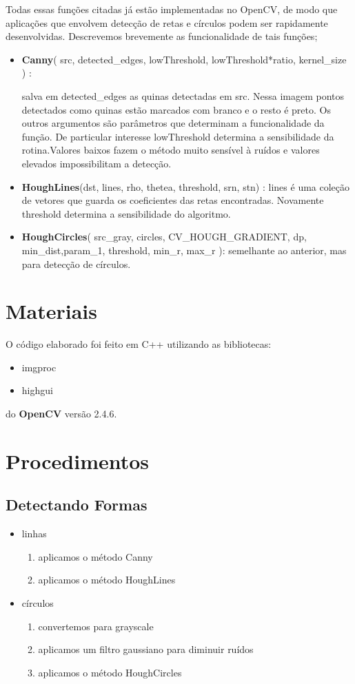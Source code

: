 \documentclass[journal]{IEEEtran}
\begin{document}
Todas essas funções citadas já estão
implementadas no OpenCV, de modo que aplicações que envolvem detecção
de retas e círculos podem ser rapidamente desenvolvidas. Descrevemos brevemente
as funcionalidade de tais funções;
\begin{itemize}
	\item 
	\textbf{Canny}( src, detected\_edges, lowThreshold, lowThreshold*ratio, kernel\_size ) :

	salva em detected\_edges as quinas detectadas em src. Nessa imagem pontos detectados como quinas estão marcados com branco e o resto é preto. Os outros
	argumentos são parâmetros que determinam a funcionalidade da função. De particular interesse lowThreshold determina a sensibilidade da rotina.Valores baixos
	fazem o método muito sensível à ruídos e valores elevados impossibilitam a detecção. 
	
	\item \textbf{HoughLines}(dst, lines, rho, thetea, threshold, srn, stn) :
	lines é uma coleção de vetores que guarda os coeficientes das retas
	encontradas. Novamente threshold determina a sensibilidade do algoritmo.
	
	\item \textbf{HoughCircles}( src\_gray, circles, CV\_HOUGH\_GRADIENT, dp, min\_dist,param\_1, threshold, min\_r, max\_r ):
	semelhante ao anterior, mas para detecção de círculos.
		
\end{itemize}

\newpage
\section{Materiais}
O código elaborado foi feito em C++ utilizando as bibliotecas:
\begin{itemize}
\item imgproc
\item highgui
\end{itemize}
do \textbf{OpenCV} versão 2.4.6.


\section{Procedimentos}
\subsection{Detectando Formas}
\begin{itemize}
	\item linhas
		\begin{enumerate}
			\item aplicamos o método Canny
			\item aplicamos o método  HoughLines
		\end{enumerate}
	\item círculos
		\begin{enumerate}
			\item convertemos para grayscale
			\item aplicamos um filtro gaussiano para diminuir ruídos
			\item aplicamos o método  HoughCircles
		\end{enumerate}
\end{itemize}
\end{document}
